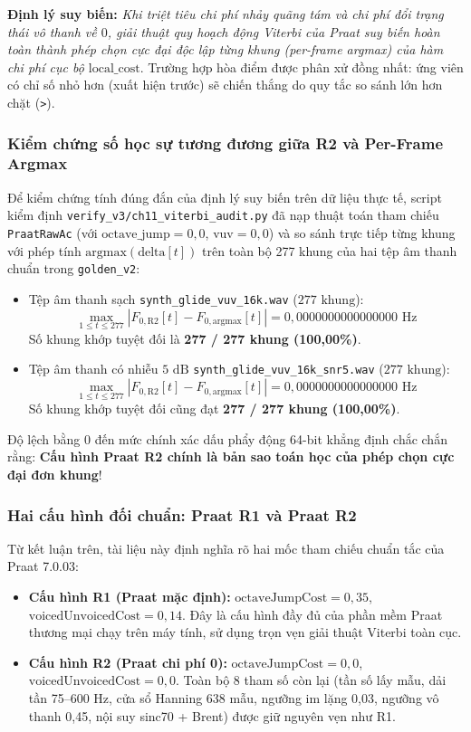 \textbf{Định lý suy biến:} \emph{Khi triệt tiêu chi phí nhảy quãng tám và chi phí đổi trạng thái vô thanh về $0$, giải thuật quy hoạch động Viterbi của Praat suy biến hoàn toàn thành phép chọn cực đại độc lập từng khung (per-frame argmax) của hàm chi phí cục bộ $\text{local\_cost}$}.
Trường hợp hòa điểm được phân xử đồng nhất: ứng viên có chỉ số nhỏ hơn (xuất hiện trước) sẽ chiến thắng do quy tắc so sánh lớn hơn chặt (\texttt{>}).

\subsubsection*{Kiểm chứng số học sự tương đương giữa R2 và Per-Frame Argmax}
Để kiểm chứng tính đúng đắn của định lý suy biến trên dữ liệu thực tế, script kiểm định \texttt{verify\_v3/ch11\_viterbi\_audit.py} đã nạp thuật toán tham chiếu \texttt{PraatRawAc} (với $\text{octave\_jump}=0{,}0$, $\text{vuv}=0{,}0$) và so sánh trực tiếp từng khung với phép tính $\text{argmax}(\text{delta}[t])$ trên toàn bộ 277 khung của hai tệp âm thanh chuẩn trong \texttt{golden\_v2}:
\begin{itemize}
    \item Tệp âm thanh sạch \texttt{synth\_glide\_vuv\_16k.wav} ($277\text{ khung}$):
    \begin{equation}
        \max_{1 \le t \le 277} |F_{0,\text{R2}}[t] - F_{0,\text{argmax}}[t]| = 0{,}0000000000000000\text{ Hz}
    \end{equation}
    Số khung khớp tuyệt đối là \textbf{277 / 277 khung (100,00\%)}.
    \item Tệp âm thanh có nhiễu $5\text{ dB}$ \texttt{synth\_glide\_vuv\_16k\_snr5.wav} ($277\text{ khung}$):
    \begin{equation}
        \max_{1 \le t \le 277} |F_{0,\text{R2}}[t] - F_{0,\text{argmax}}[t]| = 0{,}0000000000000000\text{ Hz}
    \end{equation}
    Số khung khớp tuyệt đối cũng đạt \textbf{277 / 277 khung (100,00\%)}.
\end{itemize}
Độ lệch bằng $0$ đến mức chính xác dấu phẩy động 64-bit khẳng định chắc chắn rằng: \textbf{Cấu hình Praat R2 chính là bản sao toán học của phép chọn cực đại đơn khung}!

\subsubsection*{Hai cấu hình đối chuẩn: Praat R1 và Praat R2}
Từ kết luận trên, tài liệu này định nghĩa rõ hai mốc tham chiếu chuẩn tắc của Praat 7.0.03:
\begin{itemize}
    \item \textbf{Cấu hình R1 (Praat mặc định):} $\text{octaveJumpCost} = 0{,}35$, $\text{voicedUnvoicedCost} = 0{,}14$. Đây là cấu hình đầy đủ của phần mềm Praat thương mại chạy trên máy tính, sử dụng trọn vẹn giải thuật Viterbi toàn cục.
    \item \textbf{Cấu hình R2 (Praat chi phí 0):} $\text{octaveJumpCost} = 0{,}0$, $\text{voicedUnvoicedCost} = 0{,}0$. Toàn bộ 8 tham số còn lại (tần số lấy mẫu, dải tần 75--600 Hz, cửa sổ Hanning 638 mẫu, ngưỡng im lặng 0,03, ngưỡng vô thanh 0,45, nội suy sinc70 + Brent) được giữ nguyên vẹn như R1.
\end{itemize}

